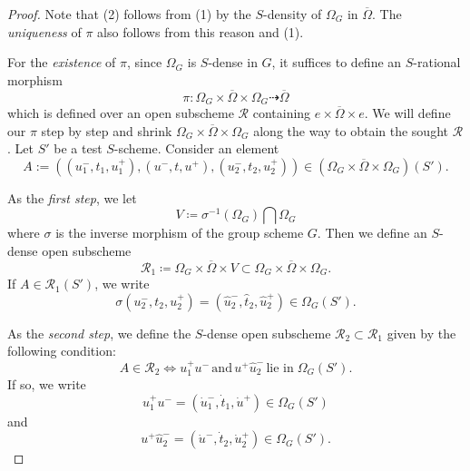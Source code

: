 \documentclass[11pt, reqno]{amsart}
\theoremstyle{plain}
\theoremstyle{definition}
\begin{document}
\begin{proof}
    Note that (2) follows from (1) by the $S$-density of $\Omega_G$ in $\overline{\Omega}$. The \emph{uniqueness} of $\pi$ also follows from this reason and (1).

    
    For the \emph{existence} of $\pi$, since $\Omega_G$ is $S$-dense in $G$, it suffices to define an $S$-rational morphism $$\pi\colon\Omega_G\times\overline{\Omega}\times\Omega_G\dashrightarrow \overline{\Omega}$$
    which is defined over an open subscheme $\mathcal{R}$ containing $e\times\overline{\Omega}\times e$.
    We will define our $\pi$ step by step and shrink $\Omega_G\times\overline{\Omega}\times\Omega_G$ along the way to obtain the sought $\mathcal{R}$. 
    Let $S'$ be a test $S$-scheme.
    Consider an element
    $$A:=((u_1^-,t_1, u_1^+),(u^-,t, u^+),(u_2^-,t_2, u_2^+))\in (\Omega_G\times\overline{\Omega}\times\Omega_G)(S').$$
    
    
    As the \emph{first step}, we let 
    $$V\coloneq\sigma^{-1}(\Omega_G)\bigcap \Omega_G$$
    where $\sigma$ is the inverse morphism of the group scheme $G$. Then we define an $S$-dense open subscheme 
    $$\mathcal{R}_1\coloneq\Omega_G\times\overline{\Omega}\times  V\subset\Omega_G\times\overline{\Omega}\times\Omega_G.$$
    If $A\in \mathcal{R}_1(S')$, we write 
    $$\sigma(u_2^-,t_2, u_2^+)=(\hat{u}_2^-,\hat{t}_2, \hat{u}_2^+)\in \Omega_G(S').$$
    
    As the \emph{second step}, we define 
    the $S$-dense open subscheme $\mathcal{R}_2\subset\mathcal{R}_1$ given by the following condition:
    $$A\in \mathcal{R}_2\iff
    u_1^+u^-\, \text{and}\,u^+\hat{u}_2^-\, \text{lie in}\; \Omega_G(S').$$
    If so, we write 
    \begin{equation}\label{comutequation1}
        u_1^+u^-=(\dot{u}_1^-, \dot{t}_1, \dot{u}^+)\in\Omega_G(S')
    \end{equation} 
    and 
    \begin{equation}\label{comutequation2}
        u^+\hat{u}_2^-=(\dot{u}^- ,\dot{t}_2 ,\dot{u}_2^+)\in\Omega_G(S').
    \end{equation}
    
    
    


\end{proof}
\end{document}
